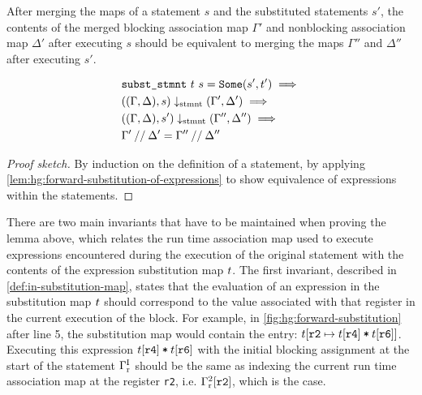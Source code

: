 
\begin{lemma}%
  \label{lem:hg:equivalence-of-statement-subst}

  After merging the maps of a statement $s$ and the substituted statements $s'$,
  the contents of the merged blocking association map $\Gamma'$ and nonblocking
  association map $\Delta'$ after executing $s$ should be equivalent to merging
  the maps $\Gamma''$ and $\Delta''$ after executing $s'$.

  {\normalfont
    \begin{equation*}
      \begin{aligned}
        &\texttt{subst\_stmnt}\ t\ s = \texttt{Some}(s', t')\implies\\
        &((\Gamma, \Delta), s) \downarrow_{\text{stmnt}} (\Gamma', \Delta')
          \implies\\
        &((\Gamma, \Delta), s') \downarrow_{\text{stmnt}} (\Gamma'', \Delta'')
          \implies\\
        &\Gamma' \mathbin{//} \Delta' = \Gamma'' \mathbin{//} \Delta''
      \end{aligned}
    \end{equation*}}

  \begin{proof}[Proof sketch]
    By induction on the definition of a statement, by applying
    \cref{lem:hg:forward-substitution-of-expressions} to show equivalence of
    expressions within the statements.
  \end{proof}
\end{lemma}

There are two main invariants that have to be maintained when proving the lemma
above, which relates the run time association map used to execute expressions
encountered during the execution of the original statement with the contents of
the expression substitution map $t$.  The first invariant, described in
\cref{def:in-substitution-map}, states that the evaluation of an expression in
the substitution map $t$ should correspond to the value associated with
that register in the current execution of the block.  For example, in
\cref{fig:hg:forward-substitution} after line 5, the substitution map would
contain the entry:
$t\!\left[\texttt{r2} \mapsto t\!\left[\texttt{r4}\right]
  \mathbin{\texttt{*}} t\!\left[\texttt{r6}\right]\right]$.  Executing this expression
$t\!\left[\texttt{r4}\right] \mathbin{\texttt{*}} t\!\left[\texttt{r6}\right]$
with the initial blocking assignment at the start of the statement
${\Gamma}^{\mathrm I}_{\mathrm r}$ should be the same as indexing the current
run time association map at the register \texttt{r2},
i.e. ${\Gamma}^{2}_{\mathrm r}\!\left[\texttt{r2}\right]$, which is the case.

